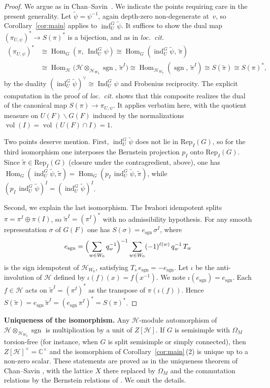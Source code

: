 \documentclass[11pt]{amsart}
\theoremstyle{definition}
\theoremstyle{remark}
\DeclareMathOperator{\Ind}{Ind}
\DeclareMathOperator{\ind}{ind}
\DeclareMathOperator{\Hom}{Hom}
\DeclareMathOperator{\sgn}{sgn}
\DeclareMathOperator{\vol}{vol}
\newcommand{\CC}{\mathbb{C}}
\newcommand{\HH}{\mathcal{H}}
\begin{document}
\begin{proof}
We argue as in Chan--Savin~\cite[Corollary~4.5]{CS}. We indicate the points requiring care in the present generality. Let $\tilde\psi = \psi^{-1}$, again depth-zero non-degenerate at~$v$, so Corollary~\ref{cor:main} applies to $\ind_U^G\tilde\psi$. It suffices to show the dual map $(\pi_{U,\psi})^* \to S(\pi)^*$ is a bijection, and as in \emph{loc.\ cit.}
\begin{align*}
(\pi_{U,\psi})^*
&\cong \Hom_G(\pi,\, \Ind_U^G\psi)
\cong \Hom_G(\ind_U^G\tilde\psi,\, \tilde\pi) \\
&\cong \Hom_\HH\bigl(\HH\otimes_{\HH_{W_0}}\sgn,\, \tilde\pi^I\bigr)
\cong \Hom_{\HH_{W_0}}(\sgn,\, \tilde\pi^I) \cong S(\tilde\pi) \cong S(\pi)^*,
\end{align*}
by the duality $(\ind_U^G\tilde\psi)^\vee \cong \Ind_U^G\psi$ and Frobenius reciprocity. The explicit computation in the proof of \emph{loc.\ cit.} shows that this composite realizes the dual of the canonical map $S(\pi) \to \pi_{U,\psi}$. It applies verbatim here, with the quotient measure on $U(F)\backslash G(F)$ induced by the normalizations $\vol(I) = \vol(U(F)\cap I) = 1$.

Two points deserve mention. First, $\ind_U^G\tilde\psi$ does not lie in $\mathrm{Rep}_I(G)$, so for the third isomorphism one interposes the Bernstein projection $p_I$ onto $\mathrm{Rep}_I(G)$. Since $\tilde\pi\in\mathrm{Rep}_I(G)$ (closure under the contragredient, above), one has $\Hom_G(\ind_U^G\tilde\psi,\tilde\pi) = \Hom_G(p_I\,\ind_U^G\tilde\psi,\tilde\pi)$, while $(p_I\,\ind_U^G\tilde\psi)^I = (\ind_U^G\tilde\psi)^I$.

Second, we explain the last isomorphism. The Iwahori idempotent splits $\pi = \pi^I\oplus\pi(I)$, so $\tilde\pi^I = (\pi^I)^*$ with no admissibility hypothesis. For any smooth representation $\sigma$ of $G(F)$ one has $S(\sigma) = e_{\sgn}\,\sigma^I$, where
\[
e_{\sgn} = \Bigl(\sum_{w\in W_0} q_w^{-1}\Bigr)^{-1}\sum_{w\in W_0}(-1)^{\ell(w)}\,q_w^{-1}\,T_w
\]
is the sign idempotent of $\HH_{W_0}$, satisfying $T_s\,e_{\sgn} = -e_{\sgn}$. Let $\iota$ be the anti-involution of $\HH$ defined by $\iota(f)(x) = f(x^{-1})$. We note $\iota(e_{\sgn}) = e_{\sgn}$. Each $f \in \HH$ acts on $\tilde\pi^I = (\pi^I)^*$ as the transpose of $\pi(\iota(f))$. Hence $S(\tilde\pi) = e_{\sgn}\,\tilde\pi^I = (e_{\sgn}\,\pi^I)^* = S(\pi)^*$.
\end{proof}

\medskip
\noindent\textbf{Uniqueness of the isomorphism.} Any $\HH$-module automorphism of $\HH\otimes_{\HH_{W_0}}\sgn$ is multiplication by a unit of $Z[\HH]$. If $G$ is semisimple with $\Omega_M$ torsion-free (for instance, when $G$ is split semisimple or simply connected), then $Z[\HH]^\times = \CC^\times$ and the isomorphism of Corollary~\ref{cor:main}\,(2) is unique up to a non-zero scalar. These statements are proved as in the uniqueness theorem of Chan--Savin \cite[\S 4.3]{CS}, with the lattice $X$ there replaced by $\Omega_M$ and the commutation relations by the Bernstein relations of \cite[\S 5.4]{Rostami}. We omit the details.
\end{document}
